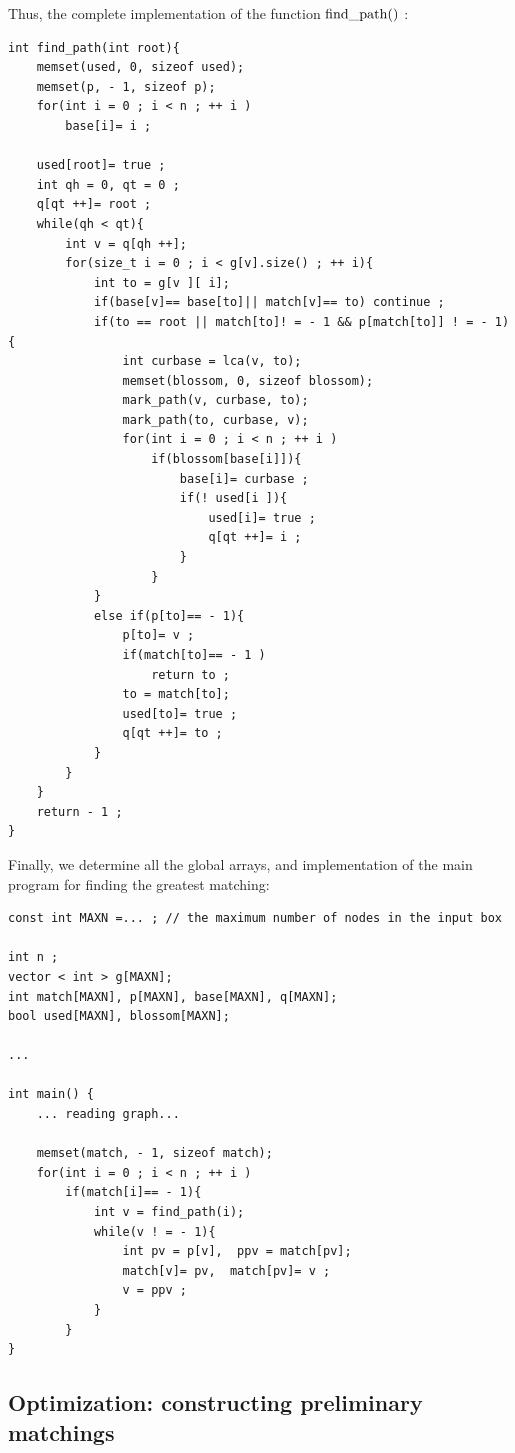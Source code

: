 Thus, the complete implementation of the function $\rm find \_path()$ :

\begin{verbatim}
int find_path(int root){
    memset(used, 0, sizeof used);
    memset(p, - 1, sizeof p);
    for(int i = 0 ; i < n ; ++ i )
        base[i]= i ;
 
    used[root]= true ;
    int qh = 0, qt = 0 ;
    q[qt ++]= root ;
    while(qh < qt){
        int v = q[qh ++];
        for(size_t i = 0 ; i < g[v].size() ; ++ i){
            int to = g[v ][ i];
            if(base[v]== base[to]|| match[v]== to) continue ;
            if(to == root || match[to]! = - 1 && p[match[to]] ! = - 1){
                int curbase = lca(v, to);
                memset(blossom, 0, sizeof blossom);
                mark_path(v, curbase, to);
                mark_path(to, curbase, v);
                for(int i = 0 ; i < n ; ++ i )
                    if(blossom[base[i]]){
                        base[i]= curbase ;
                        if(! used[i ]){
                            used[i]= true ;
                            q[qt ++]= i ;
                        }
                    }
            }
            else if(p[to]== - 1){
                p[to]= v ;
                if(match[to]== - 1 )
                    return to ;
                to = match[to];
                used[to]= true ;
                q[qt ++]= to ;
            }
        }
    }
    return - 1 ;
} 
\end{verbatim}
Finally, we determine all the global arrays, and implementation of the main program for finding the greatest matching:

\begin{verbatim}
const int MAXN =... ; // the maximum number of nodes in the input box
 
int n ;
vector < int > g[MAXN];
int match[MAXN], p[MAXN], base[MAXN], q[MAXN];
bool used[MAXN], blossom[MAXN];
 
...
 
int main() {
    ... reading graph...
 
    memset(match, - 1, sizeof match);
    for(int i = 0 ; i < n ; ++ i )
        if(match[i]== - 1){
            int v = find_path(i);
            while(v ! = - 1){
                int pv = p[v],  ppv = match[pv];
                match[v]= pv,  match[pv]= v ;
                v = ppv ;
            }
        }
} 
\end{verbatim}
\subsection{ Optimization: constructing preliminary matchings }

